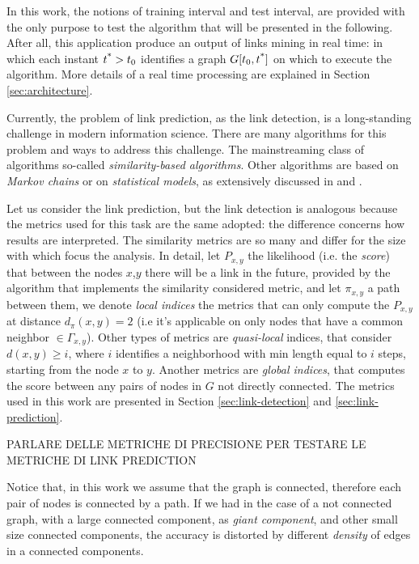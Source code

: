 In this work, the notions of training interval and test interval, are provided with the only purpose to test the algorithm that will be presented in the following. After all, this application produce an output of links mining in real time: in which each instant $t\textsuperscript{*}>t_{0}$ identifies a graph $G[t_{0},t\textsuperscript{*}]$ on which to execute the algorithm. More details of a real time processing are explained in Section \ref{sec:architecture}.

Currently, the problem of link prediction, as the link detection, is a long-standing challenge in modern information science. There are many algorithms for this problem and ways to address this challenge. The mainstreaming class of algorithms so-called \textit{similarity-based algorithms}. Other algorithms are based on \textit{Markov chains} or on \textit{statistical models}, as extensively discussed in \cite{Liben-Nowell} and \cite{Lu2011}.

Let us consider the link prediction, but the link detection is analogous because the metrics used for this task are the same adopted: the difference concerns how results are interpreted. The similarity metrics are so many and differ for the size with which focus the analysis. In detail, let $P_{x,y}$ the likelihood (i.e. the \textit{score}) that between the nodes $x$,$y$ there will be a link in the future, provided by the algorithm that implements the similarity considered metric, and let $\pi_{x,y}$ a path between them, we denote \textit{local indices} the metrics that can only compute the $P_{x,y}$ at distance $d_{\pi}(x,y) = 2$ (i.e it's applicable on only nodes that have a common neighbor $\in \Gamma_{x,y}$). Other types of metrics are \textit{quasi-local} indices, that consider $d(x,y) \geq i$, where $i$ identifies a neighborhood with min length equal to $i$ steps, starting from the node $x$ to $y$. Another metrics are \textit{global indices}, that computes the score between any pairs of nodes in $G$ not directly connected\cite{Lu2011}. The metrics used in this work are presented in Section \ref{sec:link-detection} and \ref{sec:link-prediction}.

PARLARE DELLE METRICHE DI PRECISIONE PER TESTARE LE METRICHE DI LINK PREDICTION

Notice that, in this work we assume that the graph is connected, therefore each pair of nodes is connected by a path. If we had in the case of a not connected graph, with a large connected component, as \textit{giant component}, and other small size connected components, the accuracy is distorted by different \textit{density} of edges in a connected components.

